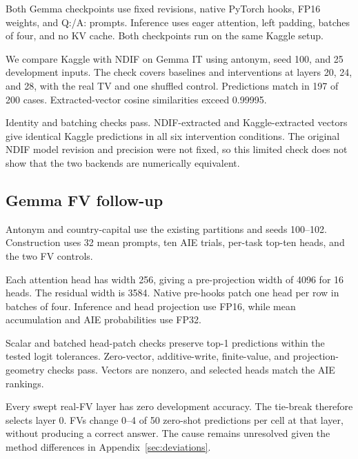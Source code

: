 \documentclass[11pt]{article}
\begin{document}
Both Gemma checkpoints use fixed revisions, native PyTorch hooks, FP16 weights, and Q:/A: prompts. Inference uses eager attention, left padding, batches of four, and no KV cache. Both checkpoints run on the same Kaggle setup.

We compare Kaggle with NDIF on Gemma IT using antonym, seed 100, and 25 development inputs. The check covers baselines and interventions at layers 20, 24, and 28, with the real TV and one shuffled control. Predictions match in 197 of 200 cases. Extracted-vector cosine similarities exceed 0.99995.

Identity and batching checks pass. NDIF-extracted and Kaggle-extracted vectors give identical Kaggle predictions in all six intervention conditions. The original NDIF model revision and precision were not fixed, so this limited check does not show that the two backends are numerically equivalent.

\subsection{Gemma FV follow-up}

Antonym and country-capital use the existing partitions and seeds 100--102. Construction uses 32 mean prompts, ten AIE trials, per-task top-ten heads, and the two FV controls.

Each attention head has width 256, giving a pre-projection width of 4096 for 16 heads. The residual width is 3584. Native pre-hooks patch one head per row in batches of four. Inference and head projection use FP16, while mean accumulation and AIE probabilities use FP32.

Scalar and batched head-patch checks preserve top-1 predictions within the tested logit tolerances. Zero-vector, additive-write, finite-value, and projection-geometry checks pass. Vectors are nonzero, and selected heads match the AIE rankings.

Every swept real-FV layer has zero development accuracy. The tie-break therefore selects layer 0. FVs change 0--4 of 50 zero-shot predictions per cell at that layer, without producing a correct answer. The cause remains unresolved given the method differences in Appendix~\ref{sec:deviations}.

\begin{table}[t]
  \centering
  \scriptsize
  \setlength{\tabcolsep}{3pt}
  
  \caption{Gemma FV accuracy (\%), averaged over three seeds. Controls average independently selected random-vector and random-head interventions; zero-shot accuracy is 0\%.}
  \label{tab:gemma-fv}
\end{table}
\end{document}
